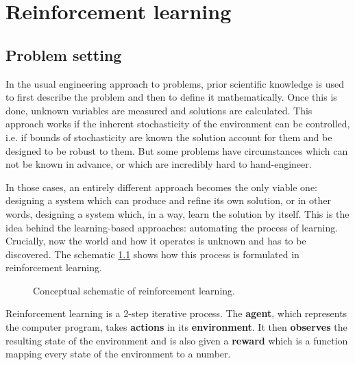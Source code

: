 \chapter{Reinforcement learning}
\label{ch-rl-background}
\section{Problem setting}
\label{subsec-problem-setting}
In the usual engineering approach to problems,
prior scientific knowledge is used to first describe the problem
and then to define it mathematically.
Once this is done, unknown variables are measured and
solutions are calculated.
This approach works if the inherent stochasticity of the environment
can be controlled, i.e. if bounds of stochasticity are known
the solution account for them and be designed to be robust to them.
But some problems have circumstances which can not be known in advance,
or which are incredibly hard to hand-engineer.

In those cases, an entirely different approach becomes the only viable one:
designing a system which can produce and refine its own solution,
or in other words, designing a system which, in a way, learn the
solution by itself.
This is the idea behind the learning-based approaches: automating the 
process of learning.
Crucially, now the world and how it operates
is unknown and has to be discovered.  
The schematic \ref{fig:rl-shematic} shows how this process is formulated in reinforcement learning.
\begin{figure}[htpb]
\begin{center}
\end{center}
\caption{Conceptual schematic of reinforcement learning.}
\label{fig:rl-shematic}
\end{figure}
Reinforcement learning is a 2-step iterative process.
The \textbf{agent}, which represents the computer program, takes \textbf{actions}
in its \textbf{environment}. It then \textbf{observes} the resulting state
of the environment and is also given a \textbf{reward}
which is a function mapping every state of the environment to a number.

